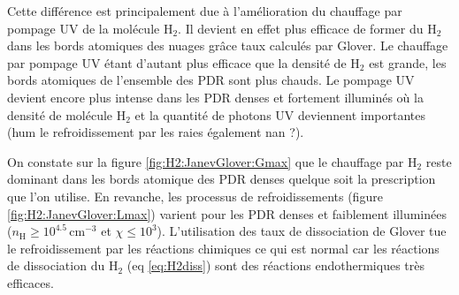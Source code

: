 Cette différence est principalement due à l'amélioration du chauffage par pompage UV de la molécule $\mathrm{H}_2$. Il devient en effet plus efficace de former du $\mathrm{H}_2$ dans les bords atomiques des nuages grâce taux calculés par Glover. Le chauffage par pompage UV étant d'autant plus efficace que la densité de $\mathrm{H}_2$ est grande, les bords atomiques de l'ensemble des PDR sont plus chauds. Le pompage UV devient encore plus intense dans les PDR denses et fortement illuminés où la densité de molécule $\mathrm{H}_2$ et la quantité de photons UV deviennent importantes (hum le refroidissement par les raies également nan ?). \newline

On constate sur la figure \ref{fig:H2:JanevGlover:Gmax} que le chauffage par $\mathrm{H}_2$ reste dominant dans les bords atomique des PDR denses quelque soit la prescription que l'on utilise. En revanche, les processus de refroidissements (figure \ref{fig:H2:JanevGlover:Lmax}) varient pour les PDR denses et faiblement illuminées ($n_\mathrm{H} \geq 10^{4.5} \, \mathrm{cm}^{-3}$ et $\chi \leq 10^3$). L'utilisation des taux de dissociation de Glover tue le refroidissement par les réactions chimiques ce qui est normal car les réactions de dissociation du $\mathrm{H}_2$ (eq \ref{eq:H2diss}) sont des réactions endothermiques très efficaces.

